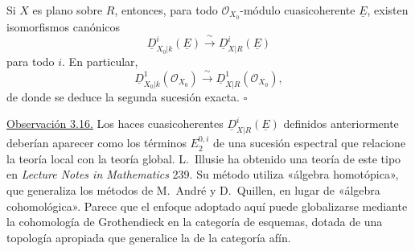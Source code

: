
Si $X$ es plano sobre $R$, entonces, para todo
$\mathcal O_{X_0}$-módulo cuasicoherente $\underline E$, existen
isomorfismos canónicos
\[
 \underline D^i_{X_0|k}(\underline E)
 \xrightarrow{\ \sim\ }
 \underline D^i_{X|R}(\underline E)
\]
para todo $i$. En particular,
\[
 \underline D^1_{X_0|k}(\mathcal O_{X_0})
 \xrightarrow{\ \sim\ }
 \underline D^1_{X|R}(\mathcal O_{X_0}),
\]
de donde se deduce la segunda sucesión exacta.
\hfill$\square$

\underline{Observación 3.16.}
Los haces cuasicoherentes $\underline D^i_{X|R}(\underline E)$
definidos anteriormente deberían aparecer como los términos
$E_2^{0,i}$ de una sucesión espectral que relacione la teoría local
con la teoría global. L.~Illusie ha obtenido una teoría de este tipo
en \emph{Lecture Notes in Mathematics} 239. Su método utiliza
«álgebra homotópica», que generaliza los métodos de M.~André y
D.~Quillen, en lugar de «álgebra cohomológica». Parece que el
enfoque adoptado aquí puede globalizarse mediante la cohomología de
Grothendieck en la categoría de esquemas, dotada de una topología
apropiada que generalice la de la categoría afín.
